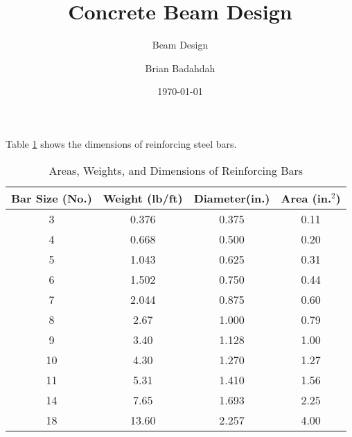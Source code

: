 \documentclass[landscape, twocolumn, 12pt]{article}
\title{Concrete Beam Design}
\subtitle{Beam Design}
\author{Brian Badahdah}
\date{\today}
\begin{document}
\maketitle





Table \ref{Tab:bars} shows the dimensions of reinforcing steel bars.

\begin{table}[h]
\centering
\caption{Areas, Weights, and Dimensions of Reinforcing Bars}
\label{Tab:bars}
\begin{tabular}{|c|c|c|c|}\hline
Bar Size (No.)&Weight (lb/ft)&Diameter(in.)&Area (in.$^2$) \\ \hline
3&0.376&0.375&0.11 \\ \hline
4&0.668&0.500&0.20 \\ \hline
5&1.043&0.625&0.31 \\ \hline
6&1.502&0.750&0.44 \\ \hline
7&2.044&0.875&0.60 \\ \hline
8&2.67&1.000&0.79 \\ \hline
9&3.40&1.128&1.00 \\ \hline
10&4.30&1.270&1.27 \\ \hline
11&5.31&1.410&1.56 \\ \hline
14&7.65&1.693&2.25 \\ \hline
18&13.60&2.257&4.00 \\ \hline
\end{tabular}
\end{table}

\clearpage
\glsaddall
\printglossary[title={Variables Definitions}]
%
%
\end{document}
